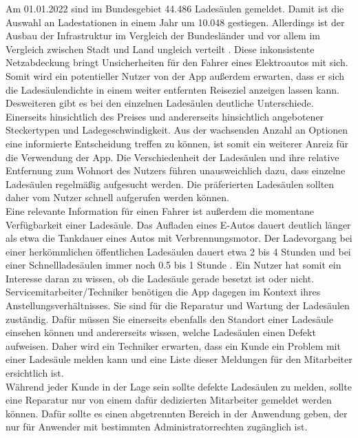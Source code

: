 \documentclass[12pt, a4paper, oneside]{article}
\begin{document}
Am 01.01.2022 sind im Bundesgebiet 44.486 Ladesäulen gemeldet. Damit ist die Auswahl an Ladestationen in einem Jahr um 10.048 gestiegen. Allerdings ist der Ausbau der Infrastruktur im Vergleich der Bundesländer und vor allem im Vergleich zwischen Stadt und Land ungleich verteilt \cite[]{Ladeinfrastruktur2022}. Diese inkonsistente Netzabdeckung bringt Unsicherheiten für den Fahrer eines Elektroautos mit sich. Somit wird ein potentieller Nutzer von der App außerdem erwarten, dass er sich die Ladesäulendichte in einem weiter entfernten Reiseziel anzeigen lassen kann.\\

Desweiteren gibt es bei den einzelnen Ladesäulen deutliche Unterschiede. Einerseits hinsichtlich des Preises und andererseits hinsichtlich angebotener Steckertypen und Ladegeschwindigkeit. Aus der wachsenden Anzahl an Optionen eine informierte Entscheidung treffen zu können, ist somit ein weiterer Anreiz für die Verwendung der App. Die Verschiedenheit der Ladesäulen und ihre relative Entfernung zum Wohnort des Nutzers führen unausweichlich dazu, dass einzelne Ladesäulen regelmäßig aufgesucht werden. Die präferierten Ladesäulen sollten daher vom Nutzer schnell aufgerufen werden können.\\

Eine relevante Information für einen Fahrer ist außerdem die momentane Verfügbarkeit einer Ladesäule. Das Aufladen eines E-Autos dauert deutlich länger als etwa die Tankdauer eines Autos mit Verbrennungsmotor. Der Ladevorgang bei einer herkömmlichen öffentlichen Ladesäulen dauert etwa 2 bis 4 Stunden und bei einer Schnellladesäulen immer noch 0.5 bis 1 Stunde \cite[]{Ladedauer}. Ein Nutzer hat somit ein Interesse daran zu wissen, ob die Ladesäule gerade besetzt ist oder nicht.\\

Servicemitarbeiter/Techniker benötigen die App dagegen im Kontext ihres Anstellungsverhältnisses. Sie sind für die Reparatur und Wartung der Ladesäulen zuständig. Dafür müssen Sie einerseits ebenfalls den Standort einer Ladesäule einsehen können und andererseits wissen, welche Ladesäulen einen Defekt aufweisen. Daher wird ein Techniker erwarten, dass ein Kunde ein Problem mit einer Ladesäule melden kann und eine Liste dieser Meldungen für den Mitarbeiter ersichtlich ist.\\

Während jeder Kunde in der Lage sein sollte defekte Ladesäulen zu melden, sollte eine Reparatur nur von einem dafür dedizierten Mitarbeiter gemeldet werden können. Dafür sollte es einen abgetrennten Bereich in der Anwendung geben, der nur für Anwender mit bestimmten Administratorrechten zugänglich ist.\\
\end{document}

